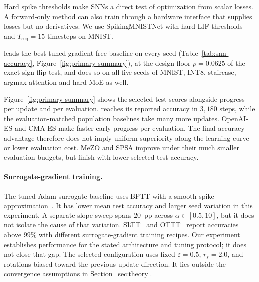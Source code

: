 Hard spike thresholds make SNNs a direct test of optimization from scalar
losses. A forward-only method can also train through a hardware interface
that supplies losses but no derivatives. We use SpikingMNISTNet with hard
LIF thresholds and $T_{\mathrm{seq}}=15$ timesteps on MNIST.

\begin{table}[t]
\caption{SNN test accuracy (\%, MNIST, hard LIF, 5 seeds, mean $\pm$ std at the validation-selected checkpoint); best gradient-free result in bold. Population baselines are matched on \emph{evaluations}, so their step counts follow their populations; the finite-difference baselines are budgeted on steps. The two axes agree on this architecture. Adam$^\dagger$ trains a surrogate relaxation of the same architecture.}
\label{tab:snn-accuracy}
\centering
\small

\end{table}

\sysname{} leads the best tuned gradient-free baseline on every seed
(Table~\ref{tab:snn-accuracy}, Figure~\ref{fig:primary-summary}), at the design floor
$p = 0.0625$ of the exact sign-flip test, and does so on all five seeds of MNIST, INT8,
staircase, argmax attention and hard MoE as well.

Figure~\ref{fig:primary-summary} shows the selected test scores alongside
progress per update and per evaluation. \sysname{} reaches its reported accuracy in $3{,}180$ steps,
while the evaluation-matched population baselines take many more updates.
OpenAI-ES and CMA-ES make faster early progress per evaluation. The final
accuracy advantage therefore does not imply uniform superiority along the
learning curve or lower evaluation cost. MeZO and SPSA improve under their
much smaller evaluation budgets, but finish with lower selected test accuracy.

\paragraph{Surrogate-gradient training.}
The tuned Adam-surrogate baseline uses BPTT with a smooth spike
approximation~\citep{neftci2019surrogate}. It has lower mean test accuracy and
larger seed variation in this experiment. A separate slope sweep spans
$20$~pp across $\alpha\in[0.5,10]$, but it does not isolate the cause of that
variation. SLTT~\citep{meng2023towards} and OTTT~\citep{xiao2022online}
report accuracies above $99\%$ with different surrogate-gradient training
recipes. Our experiment establishes performance for the stated architecture
and tuning protocol; it does not close that gap. The selected \sysname{}
configuration uses fixed $\varepsilon=0.5$, $r_s=2.0$, and rotations biased
toward the previous update direction. It lies outside the convergence
assumptions in Section~\ref{sec:theory}.

